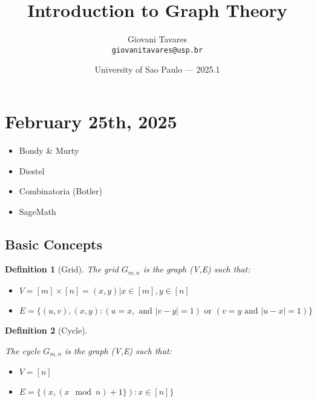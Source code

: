 \documentclass{article}
\title{Introduction to Graph Theory} %
\author{Giovani Tavares\\ \texttt{giovanitavares@usp.br}} %
\date{University of Sao Paulo --- 2025.1} %
\newtheorem{definition}{Definition}[section]
\begin{document}
\maketitle %


\section{February 25th, 2025} %


\begin{itemize}
	\item Bondy \& Murty
	\item Diestel
	\item Combinatoria (Botler)
	\item SageMath
\end{itemize}

\subsection{Basic Concepts}

\begin{definition}[Grid]
	\label{def:grade}
	The grid $G_{m,n}$  is the graph (V,E) such that:
	\begin{itemize}
		\item $V = [m] \times [n] = {(x,y) | x \in [m], y \in [n]}$
		\item $E = \{(u,v), (x,y):  (u = x, \text{  and  } |v-y| = 1) \text{  or  } (v = y \text{  and  } |u -x| = 1)\} $
	\end{itemize}
\end{definition}



\begin{definition}[Cycle]
	\label{def:cycle}
	
	The cycle $G_{m,n}$  is the graph (V,E) such that:
	\begin{itemize}
		\item $V = [n]$
		\item $E = \{(x, (x \mod n) + 1\}) :  x \in [n]\}$
		
	\end{itemize}
	
\end{definition}
\end{document}

